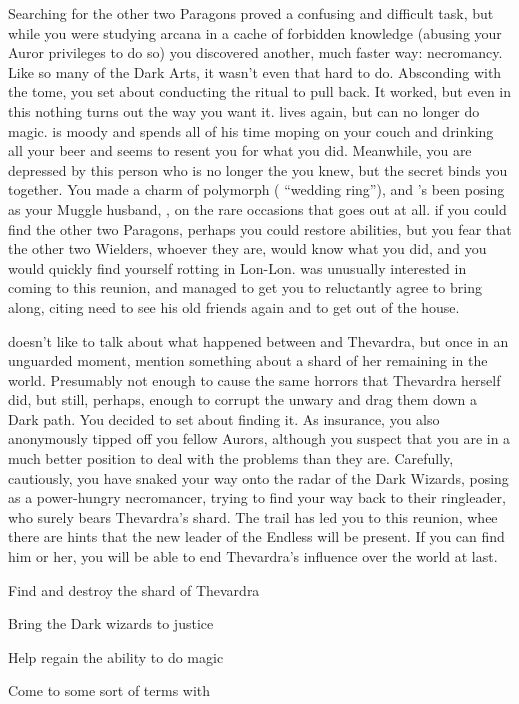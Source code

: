 \documentclass[char]{Katmeers}
\begin{document}
Searching for the other two Paragons proved a confusing and difficult task, but while you were studying arcana in a cache of forbidden knowledge (abusing your Auror privileges to do so) you discovered another, much faster way: necromancy. Like so many of the Dark Arts, it wasn't even that hard to do. Absconding with the tome, you set about conducting the ritual to pull \cHarry{} back. It worked, but even in this nothing turns out the way you want it. \cHarry{} lives again, but \cHarry{\they} can no longer do magic. \cHarry{\They} is moody and spends all of his time moping on your couch and drinking all your beer and seems to resent you for what you did. Meanwhile, you are depressed by this person who is no longer the \cHarry{} you knew, but the secret binds you together. You made \cHarry{\them} a charm of polymorph (\cHarry{\their} ``wedding ring''), and \cHarry{\they}'s been posing as your Muggle husband, \cHarry{\MYname}, on the rare occasions that \cHarry{\they} goes out at all. if you could find the other two Paragons, perhaps you could restore \cHarry{\their} abilities, but you fear that the other two Wielders, whoever they are, would know what you did, and you would quickly find yourself rotting in Lon-Lon. \cHarry{} was unusually interested in coming to this reunion, and \cHarry{\they} managed to get you to reluctantly agree to bring \cHarry{\them} along, citing \cHarry{\their} need to see his old friends again and to get out of the house.

\cHarry{} doesn't like to talk about what happened between \cHarry{\them} and Thevardra, but once in an unguarded moment, \cHarry{\they} mention something about a shard of her remaining in the world. Presumably not enough to cause the same horrors that Thevardra herself did, but still, perhaps, enough  to corrupt the unwary and drag them down a Dark path. You decided to set about finding it. As insurance, you also anonymously tipped off you fellow Aurors, although you suspect that you are in a much better position to deal with the problems than they are. Carefully, cautiously, you have snaked your way onto the radar of the Dark Wizards, posing as a power-hungry necromancer, trying to find your way back to their ringleader, who surely bears Thevardra's shard. The trail has led you to this reunion, whee there are hints that the new leader of the Endless will be present. If you can find him or her, you will be able to end Thevardra's influence over the world at last.

\begin{itemz}[Goals]
	\item Find and destroy the shard of Thevardra
	\item Bring the Dark wizards to justice
	\item Help \cHarry{} regain the ability to do magic
	\item Come to some sort of terms with \cRon{}
\end{itemz}
\end{document}
